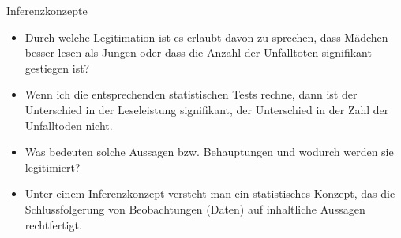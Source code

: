 \documentclass[usenames,dvipsnames,handout]{beamer}
\begin{document}
\begin{frame}{Inferenzkonzepte}
\begin{itemize}
\item{Durch welche Legitimation ist es erlaubt davon zu sprechen, dass Mädchen besser lesen als Jungen oder dass die Anzahl der Unfalltoten signifikant gestiegen ist?}\pause
\item{Wenn ich die entsprechenden statistischen Tests rechne, dann ist der Unterschied in der Leseleistung signifikant, der Unterschied in der Zahl der Unfalltoden nicht.}\pause
\item{Was bedeuten solche Aussagen bzw. Behauptungen und wodurch werden sie legitimiert?}\pause
\item{Unter einem Inferenzkonzept versteht man ein statistisches Konzept, das die Schlussfolgerung von Beobachtungen (Daten) auf inhaltliche Aussagen rechtfertigt.}
\end{itemize}
\end{frame}
\end{document}
